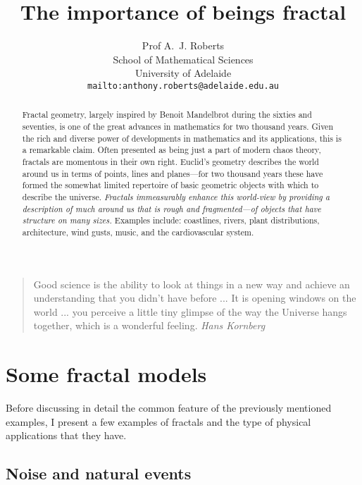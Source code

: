 \documentclass[12pt,a5paper]{article}
\title{The importance of beings fractal}
\author{Prof A.~J. Roberts\\
School of Mathematical Sciences\\
University of Adelaide\\
\texttt{mailto:anthony.roberts@adelaide.edu.au}
}
\begin{document}
\maketitle


\begin{quote}
	Good science is the ability to look at things in a new way and 
	achieve an understanding that you didn't have before ... It is opening 
	windows on the world ... you perceive a little tiny glimpse of the way 
	the Universe hangs together, which is a wonderful feeling.  \emph{Hans 
	Kornberg}
\end{quote}

\begin{abstract}
	Fractal geometry, largely inspired by Benoit Mandelbrot during the 
	sixties and seventies, is one of the great advances in mathematics 
	for two thousand years.  Given the rich and diverse power of 
	developments in mathematics and its applications, this is a 
	remarkable claim.  Often presented as being just a part of modern 
	chaos theory, fractals are momentous in their own right.  Euclid's 
	geometry describes the world around us in terms of points, lines and 
	planes---for two thousand years these have formed the somewhat 
	limited repertoire of basic geometric objects with which to describe 
	the universe.  \emph{Fractals immeasurably enhance this world-view by 
	providing a description of much around us that is rough and 
	fragmented---of objects that have structure on many sizes.}  Examples 
	include: coastlines, rivers, plant distributions, architecture, wind 
	gusts, music, and the cardiovascular system.  
\end{abstract}

\tableofcontents

\section{Some fractal models}

Before discussing in detail the common feature of the previously 
mentioned examples, I present a few examples of fractals and the type 
of physical applications that they have.  

\subsection{Noise and natural events}
\end{document}
